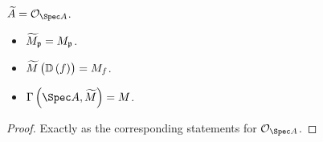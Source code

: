 \begin{example*}
$ \widetilde{A} = \OOO_{\Spec A} $.
\end{example*}

\begin{proposition}
\hfill
\begin{itemize}
\item $ \widetilde{M}_{\mathfrak{p}} = M_{\mathfrak{p}} $.
\item $ \widetilde{M}\br{\DD\br{f}} = M_f $.
\item $ \Gamma\br{\Spec A, \widetilde{M}} = M $.
\end{itemize}
\end{proposition}

\begin{proof}
Exactly as the corresponding statements for $ \OOO_{\Spec A} $.
\end{proof}

